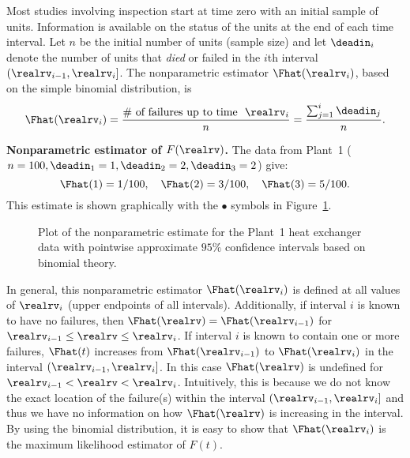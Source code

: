 Most studies involving inspection start at time zero with an initial sample of
units. Information is available on the status of the units
at the end of each time interval.  Let $n$ be the initial 
number of units (sample size) and let
$\deadin_{i}$ denote the number of units that {\em died} or failed 
in the $i$th interval $(\realrv_{i-1}, \realrv_{i}]$.
The nonparametric
estimator $\Fhat(\realrv_{i})$, based on the simple binomial distribution, is 
\begin{equation}
\label{equation:binomial.ecdf}
\Fhat(\realrv_{i})=\frac{
\# \,\, \mbox{of failures up to time } \,\, \realrv_{i}
                           }
			   {n}
=\frac{
       \sum_{j=1}^{i} \deadin_{j}
      } {n}.
\end{equation}

\begin{example}
\label{example:npe.heat.exchanger.p1}
{\bf Nonparametric estimator of $F(\realrv)$.}
The data from Plant~1 ($n=100, \deadin_{1}=1,
 \deadin_{2}=2,  \deadin_{3}=2 $) give:
\begin{displaymath}
\Fhat(1)=1/100, \quad \Fhat(2)=3/100, \quad \Fhat(3)=5/100.
\end{displaymath}
This estimate is shown graphically with the $\bullet$ symbols in
Figure~\ref{figure:heatexchplant1.cdf.pw.ps}.
\begin{figure}
\caption{Plot of the nonparametric estimate 
for the Plant~1 heat exchanger data 
with  pointwise approximate $95\%$ confidence
intervals based on binomial theory.}
\label{figure:heatexchplant1.cdf.pw.ps}
\end{figure}
\end{example}


In general, this nonparametric estimator $\Fhat(\realrv_{i})$ is
defined at all values of $\realrv_{i}$ (upper endpoints of all
intervals).  Additionally, if interval $i$ is known to have no
failures, then $\Fhat(\realrv)=\Fhat(\realrv_{i-1})$ for
$\realrv_{i-1} \leq \realrv \leq
\realrv_{i}$. If interval $i$ is known to contain one or more
failures, $\Fhat(t)$ increases from $\Fhat(\realrv_{i-1})$ to
$\Fhat(\realrv_{i})$ in the interval $(\realrv_{i-1},\realrv_{i}]$.
In this case $\Fhat(\realrv)$ is undefined for $\realrv_{i-1} <
\realrv < \realrv_{i}$.  Intuitively, this is because we do not know
the exact location of the failure(s) within the interval
$(\realrv_{i-1},\realrv_{i}]$ and thus we have no information on how
$\Fhat(\realrv)$ is increasing in the interval.  By using the binomial
distribution, it is easy to show that $\Fhat(\realrv_{i})$ is the
maximum likelihood estimator of $F(t)$.


